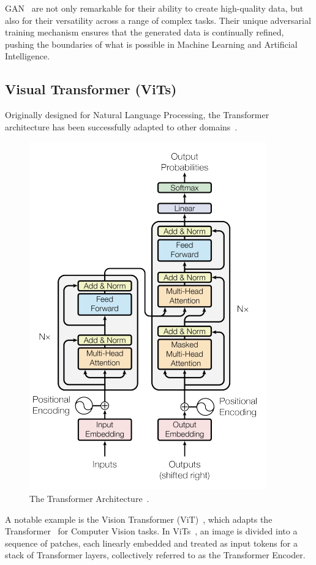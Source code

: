 \documentclass[12pt,a4paper]{report}
\begin{document}
GAN~\cite{goodfellow2014generative} are not only remarkable for their ability to create high-quality data, but also for their versatility across a range of complex tasks. Their unique adversarial training mechanism ensures that the generated data is continually refined, pushing the boundaries of what is possible in Machine Learning and Artificial Intelligence.

\subsection{Visual Transformer (ViTs)}

Originally designed for Natural Language Processing, the Transformer~\cite{vaswani2017attention} architecture has been successfully adapted to other domains~\cite{vit}.

\begin{figure}[th]
  \centering
  \includegraphics[scale=0.85]{./pics/transformer.png}
  \caption[The Transformer Architecture]{The Transformer Architecture~\cite{vaswani2017attention}.}
  \label{fig:pi7}
\end{figure}

A notable example is the Vision Transformer (ViT)~\cite{dosovitskiy2020}, which adapts the Transformer~\cite{vaswani2017attention} for Computer Vision tasks. In ViTs~\cite{dosovitskiy2020}, an image is divided into a sequence of patches, each linearly embedded and treated as input tokens for a stack of Transformer layers, collectively referred to as the Transformer Encoder.
\end{document}
